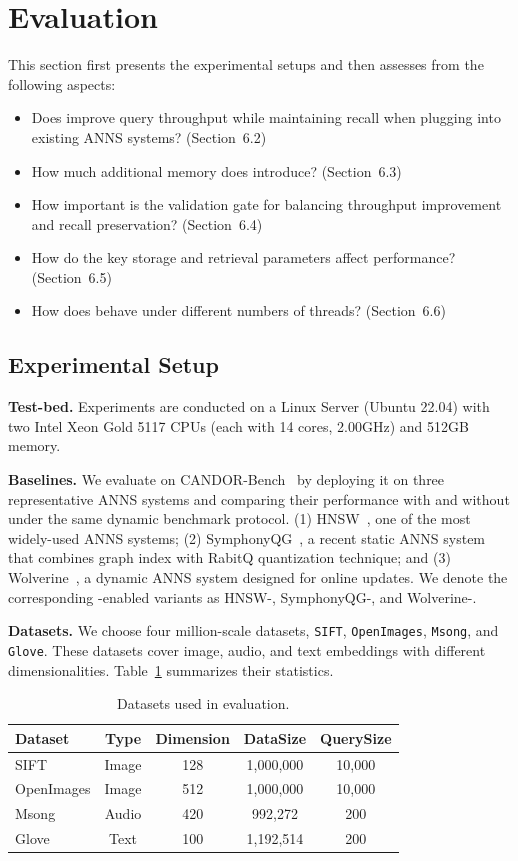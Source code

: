 \section{Evaluation}
This section first presents the experimental setups and then assesses \system from the following aspects:
\begin{itemize}
    \item Does \system improve query throughput while maintaining recall when plugging into existing ANNS systems? (Section~6.2)
    \item How much additional memory does \system introduce? (Section~6.3)
    \item How important is the validation gate for balancing throughput improvement and recall preservation? (Section~6.4)
    \item How do the key storage and retrieval parameters affect performance? (Section~6.5)
    \item How does \system behave under different numbers of threads? (Section~6.6)
\end{itemize}
\subsection{Experimental Setup}
\noindent \textbf{Test-bed.} Experiments are conducted on a Linux Server (Ubuntu 22.04) with two Intel Xeon Gold 5117 CPUs (each with 14 cores, 2.00GHz) and 512GB memory.

\noindent \textbf{Baselines.} We evaluate \system on CANDOR-Bench~\cite{Wang202627} by deploying it on three representative ANNS systems and comparing their performance with and without \system under the same dynamic benchmark protocol.
(1) HNSW~\cite{Malkov2020824}, one of the most widely-used ANNS systems;
(2) SymphonyQG~\cite{Gou2025}, a recent static ANNS system that combines graph index with RabitQ quantization technique; and 
(3) Wolverine~\cite{Liu20252268}, a dynamic ANNS system designed for online updates.
We denote the corresponding \system-enabled variants as HNSW-\system, SymphonyQG-\system, and Wolverine-\system.


\noindent \textbf{Datasets.} We choose four million-scale datasets, \texttt{SIFT}, \texttt{OpenImages}, \texttt{Msong}, and \texttt{Glove}.
These datasets cover image, audio, and text embeddings with different dimensionalities. 
Table~\ref{tab:eval-datasets} summarizes their statistics. 

\begin{table}[t]
    \centering
    \caption{Datasets used in evaluation.}
    \label{tab:eval-datasets}
    \begin{tabular}{lcccc}
        \toprule
        Dataset & Type & Dimension & DataSize & QuerySize \\
        \midrule
        SIFT & Image &128 & 1,000,000 & 10,000 \\
        OpenImages & Image & 512 & 1,000,000 & 10,000 \\
        Msong & Audio & 420 & 992,272 & 200 \\
        Glove & Text & 100 &  1,192,514 & 200 \\
        \bottomrule
    \end{tabular}
\end{table}

